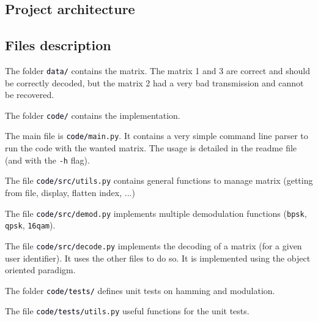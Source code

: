 \documentclass[a4paper, 12pt, twoside]{article}
\begin{document}
\begin{indt}{\section{Project architecture}}
        \begin{indt}{\subsection{Files description}} %
            The folder \texttt{\textcolor{00f}{data/}} contains the matrix. The matrix 1 and 3 are correct and should be correctly decoded, but the matrix 2 had a very bad transmission and cannot be recovered. 
            
            The folder \texttt{\textcolor{00f}{code/}} contains the implementation.
            
            The main file is \texttt{\textcolor{00f}{code/}main.py}. It contains a very simple command line parser to run the code with the wanted matrix.
            The usage is detailed in the readme file (and with the \texttt{-h} flag).
            
            The file \texttt{\textcolor{00f}{code/src/}utils.py} contains general functions to manage matrix (getting from file, display, flatten index, ...)
            
            The file \texttt{\textcolor{00f}{code/src/}demod.py} implements multiple demodulation functions (\texttt{bpsk}, \texttt{qpsk}, \texttt{16qam}).
            
            The file \texttt{\textcolor{00f}{code/src/}decode.py} implements the decoding of a matrix (for a given user identifier).
            It uses the other files to do so.
            It is implemented using the object oriented paradigm.
            
            The folder \texttt{\textcolor{00f}{code/tests/}} defines unit tests on hamming and modulation.
            
            The file \texttt{\textcolor{00f}{code/tests/}utils.py} useful functions for the unit tests.
        \end{indt} %
    \end{indt}%
\end{document}

